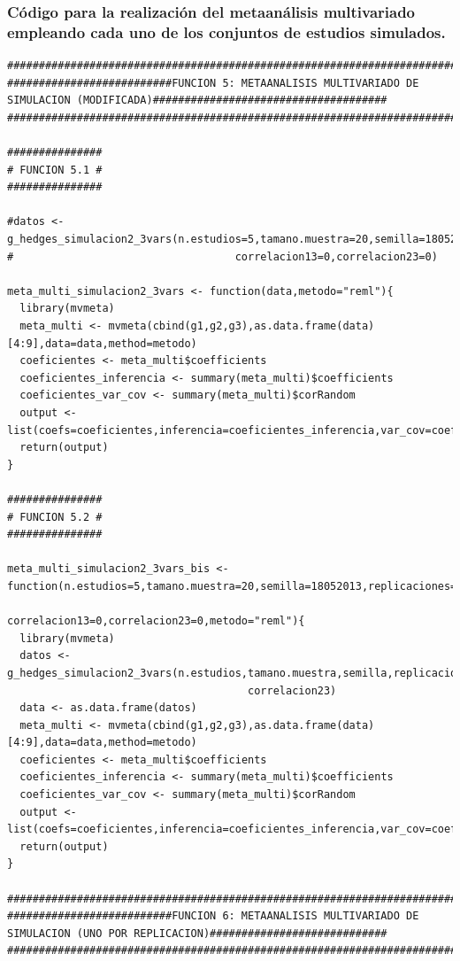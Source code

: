\documentclass[a4paper,openright,12pt]{report}
\begin{document}
\subsubsection{Código para la realización del metaanálisis multivariado empleando cada uno de los conjuntos de estudios simulados.}
{\tiny
\begin{verbatim}
##############################################################################################################################
##########################FUNCION 5: METAANALISIS MULTIVARIADO DE SIMULACION (MODIFICADA)#####################################
##############################################################################################################################

###############
# FUNCION 5.1 #
###############

#datos <- g_hedges_simulacion2_3vars(n.estudios=5,tamano.muestra=20,semilla=18052013,replicaciones=5,correlacion12=0,
#                                   correlacion13=0,correlacion23=0)

meta_multi_simulacion2_3vars <- function(data,metodo="reml"){
  library(mvmeta)
  meta_multi <- mvmeta(cbind(g1,g2,g3),as.data.frame(data)[4:9],data=data,method=metodo)
  coeficientes <- meta_multi$coefficients
  coeficientes_inferencia <- summary(meta_multi)$coefficients
  coeficientes_var_cov <- summary(meta_multi)$corRandom
  output <- list(coefs=coeficientes,inferencia=coeficientes_inferencia,var_cov=coeficientes_var_cov)
  return(output)
}

###############
# FUNCION 5.2 #
###############

meta_multi_simulacion2_3vars_bis <- function(n.estudios=5,tamano.muestra=20,semilla=18052013,replicaciones=5,correlacion12=0,
                                             correlacion13=0,correlacion23=0,metodo="reml"){
  library(mvmeta)
  datos <- g_hedges_simulacion2_3vars(n.estudios,tamano.muestra,semilla,replicaciones,correlacion12,correlacion13,
                                      correlacion23)
  data <- as.data.frame(datos)
  meta_multi <- mvmeta(cbind(g1,g2,g3),as.data.frame(data)[4:9],data=data,method=metodo)
  coeficientes <- meta_multi$coefficients
  coeficientes_inferencia <- summary(meta_multi)$coefficients
  coeficientes_var_cov <- summary(meta_multi)$corRandom
  output <- list(coefs=coeficientes,inferencia=coeficientes_inferencia,var_cov=coeficientes_var_cov)
  return(output)  
}

##############################################################################################################################
##########################FUNCION 6: METAANALISIS MULTIVARIADO DE SIMULACION (UNO POR REPLICACION)############################
##############################################################################################################################


\end{verbatim}}
\end{document}
